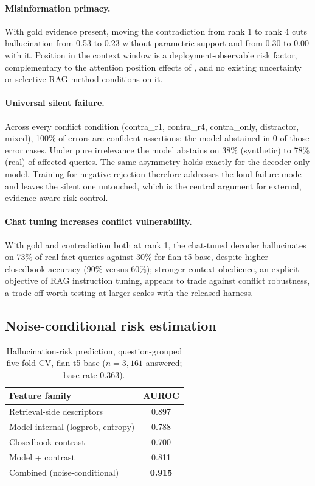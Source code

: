 \documentclass[sn-basic]{sn-jnl}
\theoremstyle{thmstyleone}
\theoremstyle{thmstyletwo}
\begin{document}
\paragraph{Misinformation primacy.}
With gold evidence present, moving the contradiction from rank 1 to
rank 4 cuts hallucination from 0.53 to 0.23 without parametric support
and from 0.30 to 0.00 with it. Position in the context window is a
deployment-observable risk factor, complementary to the attention
position effects of \citet{liu2024lost}, and no existing uncertainty
or selective-RAG method conditions on it.

\paragraph{Universal silent failure.}
Across every conflict condition (contra\_r1, contra\_r4, contra\_only,
distractor, mixed), 100\% of errors are confident assertions; the model
abstained in 0 of those error cases. Under pure irrelevance the model
abstains on 38\% (synthetic) to 78\% (real) of affected queries. The
same asymmetry holds exactly for the decoder-only model. Training for
negative rejection \citep{chen2023rgb} therefore
addresses the loud failure mode and leaves the silent one untouched,
which is the central argument for external, evidence-aware risk
control.



\paragraph{Chat tuning increases conflict vulnerability.}
With gold and contradiction both at rank 1, the chat-tuned decoder hallucinates
on 73\% of real-fact queries against 30\% for flan-t5-base, despite higher
closedbook accuracy (90\% versus 60\%); stronger context obedience, an explicit
objective of RAG instruction tuning, appears to trade against conflict
robustness, a trade-off worth testing at larger scales with the released harness.

\subsection{Noise-conditional risk estimation}\label{sec:estimation}

\begin{table}[tbp]
\centering\small
\caption{Hallucination-risk prediction, question-grouped five-fold CV,
flan-t5-base ($n = 3{,}161$ answered; base rate 0.363).}
\label{tab:auroc}
\begin{tabular}{lc}
\toprule
Feature family & AUROC \\
\midrule
Retrieval-side descriptors        & 0.897 \\
Model-internal (logprob, entropy) & 0.788 \\
Closedbook contrast               & 0.700 \\
Model + contrast                  & 0.811 \\
Combined (noise-conditional)      & \textbf{0.915} \\
\bottomrule
\end{tabular}
\end{table}
\end{document}
